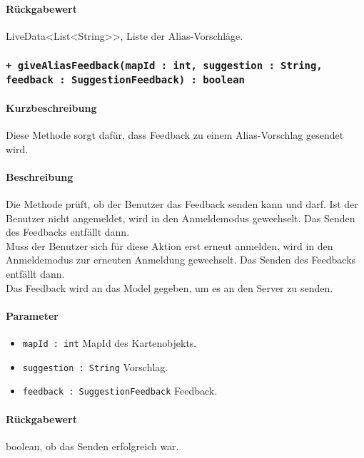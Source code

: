 \paragraph*{Rückgabewert}
LiveData<List<String>>, Liste der Alias-Vorschläge.

\subsubsection*{\texttt{+ giveAliasFeedback(mapId : int, suggestion : String, feedback : SuggestionFeedback) : boolean}}%
\paragraph*{Kurzbeschreibung}
Diese Methode sorgt dafür, dass Feedback zu einem Alias-Vorschlag gesendet wird.
\paragraph*{Beschreibung}
Die Methode prüft, ob der Benutzer das Feedback senden kann und darf.
Ist der Benutzer nicht angemeldet, wird in den Anmeldemodus gewechselt. Das Senden des Feedbacks entfällt dann.\\
Muss der Benutzer sich für diese Aktion erst erneut anmelden, wird in den Anmeldemodus zur erneuten Anmeldung gewechselt. Das Senden des Feedbacks entfällt dann.\\
Das Feedback wird an das Model gegeben, um es an den Server zu senden.
\paragraph*{Parameter}
\begin{itemize}
    \item \texttt{mapId : int} MapId des Kartenobjekts.
    \item \texttt{suggestion : String} Vorschlag. 
    \item \texttt{feedback : SuggestionFeedback} Feedback.
\end{itemize}
\paragraph*{Rückgabewert}
boolean, ob das Senden erfolgreich war.
